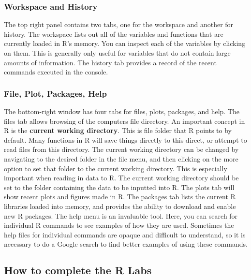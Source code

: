 \documentclass[
]{book}
\begin{document}
\hypertarget{workspace-and-history}{%
\subsubsection{Workspace and History}\label{workspace-and-history}}

The top right panel contains two tabs, one for the workspace and another for history. The workspace lists out all of the variables and functions that are currently loaded in R's memory. You can inspect each of the variables by clicking on them. This is generally only useful for variables that do not contain large amounts of information. The history tab provides a record of the recent commands executed in the console.

\hypertarget{file-plot-packages-help}{%
\subsubsection{File, Plot, Packages, Help}\label{file-plot-packages-help}}

The bottom-right window has four tabs for files, plots, packages, and help. The files tab allows browsing of the computers file directory. An important concept in R is the \textbf{current working directory}. This is file folder that R points to by default. Many functions in R will save things directly to this direct, or attempt to read files from this directory. The current working directory can be changed by navigating to the desired folder in the file menu, and then clicking on the more option to set that folder to the current working directory. This is especially important when reading in data to R. The current working directory should be set to the folder containing the data to be inputted into R. The plots tab will show recent plots and figures made in R. The packages tab lists the current R libraries loaded into memory, and provides the ability to download and enable new R packages. The help menu is an invaluable tool. Here, you can search for individual R commands to see examples of how they are used. Sometimes the help files for individual commands are opaque and difficult to understand, so it is necessary to do a Google search to find better examples of using these commands.

\hypertarget{how-to-complete-the-r-labs}{%
\subsection{How to complete the R Labs}\label{how-to-complete-the-r-labs}}
\end{document}
